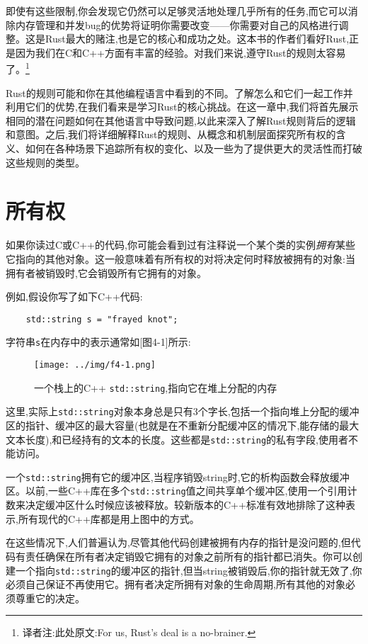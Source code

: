 即使有这些限制,你会发现它仍然可以足够灵活地处理几乎所有的任务,而它可以消除内存管理和并发bug的优势将证明你需要改变——你需要对自己的风格进行调整。这是Rust最大的赌注,也是它的核心和成功之处。这本书的作者们看好Rust,正是因为我们在C和C++方面有丰富的经验。对我们来说,遵守Rust的规则太容易了。\footnote{译者注:此处原文:For us, Rust's deal is a no-brainer.}

Rust的规则可能和你在其他编程语言中看到的不同。了解怎么和它们一起工作并利用它们的优势,在我们看来是学习Rust的核心挑战。在这一章中,我们将首先展示相同的潜在问题如何在其他语言中导致问题,以此来深入了解Rust规则背后的逻辑和意图。之后,我们将详细解释Rust的规则、从概念和机制层面探究所有权的含义、如何在各种场景下追踪所有权的变化、以及一些为了提供更大的灵活性而打破这些规则的类型。

\section{所有权}

如果你读过C或C++的代码,你可能会看到过有注释说一个某个类的实例\emph{拥有}某些它指向的其他对象。这一般意味着有所有权的对将决定何时释放被拥有的对象:当拥有者被销毁时,它会销毁所有它拥有的对象。

例如,假设你写了如下C++代码:
\begin{verbatim}
    std::string s = "frayed knot";
\end{verbatim}

字符串\texttt{s}在内存中的表示通常如\hyperref[f4-1][图4-1]所示:
\begin{figure}
    \centering
    \texttt{[image: ../img/f4-1.png]}
    \caption{一个栈上的C++ \texttt{std::string},指向它在堆上分配的内存}
    \label{f4-1}
\end{figure}

这里,实际上\texttt{std::string}对象本身总是只有3个字长,包括一个指向堆上分配的缓冲区的指针、缓冲区的最大容量(也就是在不重新分配缓冲区的情况下,能存储的最大文本长度),和已经持有的文本的长度。这些都是\texttt{std::string}的私有字段,使用者不能访问。

一个\texttt{std::string}拥有它的缓冲区,当程序销毁string时,它的析构函数会释放缓冲区。以前,一些C++库在多个\texttt{std::string}值之间共享单个缓冲区,使用一个引用计数来决定缓冲区什么时候应该被释放。较新版本的C++标准有效地排除了这种表示,所有现代的C++库都是用上图中的方式。

在这些情况下,人们普遍认为,尽管其他代码创建被拥有内存的指针是没问题的,但代码有责任确保在所有者决定销毁它拥有的对象之前所有的指针都已消失。你可以创建一个指向\texttt{std::string}的缓冲区的指针,但当string被销毁后,你的指针就无效了,你必须自己保证不再使用它。拥有者决定所拥有对象的生命周期,所有其他的对象必须尊重它的决定。

